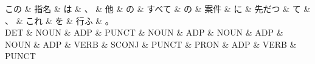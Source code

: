 \documentclass[tikz,border=5pt]{standalone}
\begin{document}
\normalsize
\begin{dependency}[edge unit distance=12.0pt]
    \begin{deptext}[column sep=1em]
        この \& 指名 \& は \& 、 \& 他 \& の \& すべて \& の \& 案件 \& に \& 先だつ \& て \& 、 \& これ \& を \& 行ふ \& 。\\
        DET \& NOUN \& ADP \& PUNCT \& NOUN \& ADP \& NOUN \& ADP \& NOUN \& ADP \& VERB \& SCONJ \& PUNCT \& PRON \& ADP \& VERB \& PUNCT\\
    \end{deptext}
\end{dependency}
\end{document}
